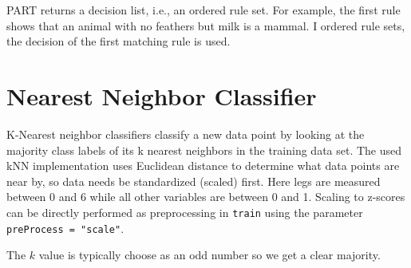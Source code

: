 \documentclass[
  notitlepage]{book}
\newenvironment{Shaded}{\begin{snugshade}}{\end{snugshade}}
\newcommand{\CommentTok}[1]{\textcolor[rgb]{0.56,0.35,0.01}{\textit{#1}}}
\newcommand{\NormalTok}[1]{#1}
\newcommand{\OperatorTok}[1]{\textcolor[rgb]{0.81,0.36,0.00}{\textbf{#1}}}
\begin{document}
\begin{Shaded}
\end{Shaded}

PART returns a decision list, i.e., an ordered rule set. For example,
the first rule shows that an animal with no feathers but milk is a mammal.
I ordered rule sets, the decision of the first matching rule is used.

\hypertarget{nearest-neighbor-classifier}{%
\section{Nearest Neighbor Classifier}\label{nearest-neighbor-classifier}}

K-Nearest neighbor classifiers classify a new data point by looking at the
majority class labels of its k nearest neighbors in the training data set.
The used kNN implementation uses Euclidean distance to determine what data points
are near by, so data needs be standardized
(scaled) first. Here legs are measured between 0 and 6 while all other
variables are between 0 and 1. Scaling to z-scores can be directly performed as
preprocessing in \texttt{train} using the parameter \texttt{preProcess\ =\ "scale"}.

The \(k\) value is typically choose as an odd number so we get a clear majority.
\end{document}
